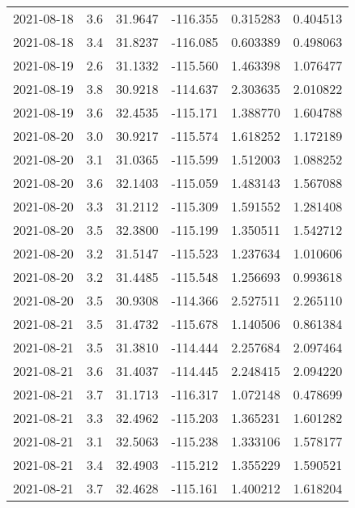 \begin{tabular}{lrrrrr}
2021-08-18 &       3.6 &  31.9647 &  -116.355 &         0.315283 &         0.404513 \\
2021-08-18 &       3.4 &  31.8237 &  -116.085 &         0.603389 &         0.498063 \\
2021-08-19 &       2.6 &  31.1332 &  -115.560 &         1.463398 &         1.076477 \\
2021-08-19 &       3.8 &  30.9218 &  -114.637 &         2.303635 &         2.010822 \\
2021-08-19 &       3.6 &  32.4535 &  -115.171 &         1.388770 &         1.604788 \\
2021-08-20 &       3.0 &  30.9217 &  -115.574 &         1.618252 &         1.172189 \\
2021-08-20 &       3.1 &  31.0365 &  -115.599 &         1.512003 &         1.088252 \\
2021-08-20 &       3.6 &  32.1403 &  -115.059 &         1.483143 &         1.567088 \\
2021-08-20 &       3.3 &  31.2112 &  -115.309 &         1.591552 &         1.281408 \\
2021-08-20 &       3.5 &  32.3800 &  -115.199 &         1.350511 &         1.542712 \\
2021-08-20 &       3.2 &  31.5147 &  -115.523 &         1.237634 &         1.010606 \\
2021-08-20 &       3.2 &  31.4485 &  -115.548 &         1.256693 &         0.993618 \\
2021-08-20 &       3.5 &  30.9308 &  -114.366 &         2.527511 &         2.265110 \\
2021-08-21 &       3.5 &  31.4732 &  -115.678 &         1.140506 &         0.861384 \\
2021-08-21 &       3.5 &  31.3810 &  -114.444 &         2.257684 &         2.097464 \\
2021-08-21 &       3.6 &  31.4037 &  -114.445 &         2.248415 &         2.094220 \\
2021-08-21 &       3.7 &  31.1713 &  -116.317 &         1.072148 &         0.478699 \\
2021-08-21 &       3.3 &  32.4962 &  -115.203 &         1.365231 &         1.601282 \\
2021-08-21 &       3.1 &  32.5063 &  -115.238 &         1.333106 &         1.578177 \\
2021-08-21 &       3.4 &  32.4903 &  -115.212 &         1.355229 &         1.590521 \\
2021-08-21 &       3.7 &  32.4628 &  -115.161 &         1.400212 &         1.618204 \\

\end{tabular}
